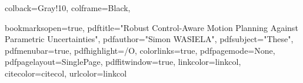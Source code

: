{  %
  colback=Gray!10,
  colframe={Black},
}







\hypersetup
{
  bookmarksopen=true,
  pdftitle="Robust Control-Aware Motion Planning Against Parametric Uncertainties",
  pdfauthor="Simon WASIELA", %
  pdfsubject="These", %
  pdfmenubar=true, %
  pdfhighlight=/O, %
  colorlinks=true, %
  pdfpagemode=None, %
  pdfpagelayout=SinglePage, %
  pdffitwindow=true, %
  linkcolor=linkcol, %
  citecolor=citecol, %
  urlcolor=linkcol %
}


